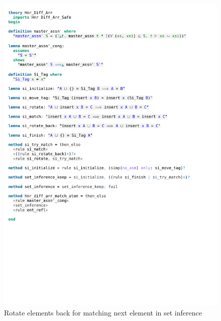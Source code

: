 \begin{figure}[!htpb]
    \includegraphics[trim={0 17,4cm 0 11,8cm}, clip, width=1.00\textwidth]{figures/Theory_Hnr_Diff_Arr_SI.pdf}
    \caption[Rotate elements back for matching next element in set inference]{Rotate elements back for matching next element in set inference}
    \label{fig:si_rotate_back}
\end{figure}

